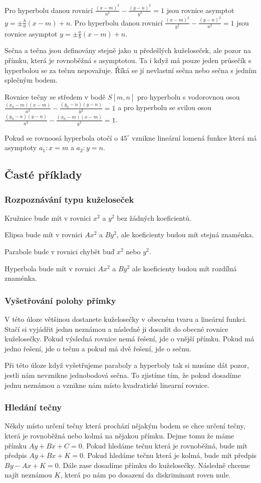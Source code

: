 \documentclass[12pt]{article}
\begin{document}
Pro hyperbolu danou rovnicí $\frac{(x-m)^2}{a^2} - \frac{(y-n)^2}{b^2} = 1$ jsou rovnice asymptot
$y = \pm \frac{b}{a}(x-m) + n$. Pro hyperbolu danou rovnicí $\frac{(x-m)^2}{b^2} - \frac{(y-n)^2}{a^2}
= 1$ jsou rovnice asymptot $y = \pm \frac{a}{b}(x-m)+n$.

Sečna a tečna jsou definovány stejně jako u předešlých kuželoseček, ale pozor na přímku, která je
rovnoběžná s asymptotou. Ta i když má pouze jeden průsečík s hyperbolou se za tečnu nepovažuje. Říká
se jí nevlastní sečna nebo sečna s jedním splečným bodem.

Rovnice tečny se středem v bodě $S[m,n]$ pro hyperbolu s vodorovnou osou $\frac{(x_0 - m)(x - m)}
{a^2} - \frac{(y_0 - n)(y-n)}{b^2} = 1$ a pro hyperbolu se svilou osou $\frac{(y_0 - n)(y-n)}{a^2} -
\frac{(x_0 - m)(x - m)}{b^2} = 1$.

Pokud se rovnoosá hyperbola otočí o $45^\circ$ vznikne lineární lomená funkce která má asymptoty
$a_1: x = m$ a $a_2: y = n$.
\subsection*{Časté příklady}
\subsubsection*{Rozpoznávání typu kuželoseček}
Kružnice bude mít v rovnici $x^2$ a $y^2$ bez žádných koeficientů.

Elipsa bude mít v rovnici $Ax^2$ a $By^2$, ale koeficienty budou mít stejná znaménka.

Parabole bude v rovnici chybět buď $x^2$ nebo $y^2$.

Hyperbola bude mít v rovnici $Ax^2$ a $By^2$ ale koeficienty budou mít rozdílná znaménka.
\subsubsection*{Vyšetřování polohy přímky}
V této úloze většinou dostanete kuželosečky v obecném tvaru a lineární funkci. Stačí si vyjádřit
jednu neznámou a následně ji dosadit do obecné rovnice kuželosečky. Pokud výsledná rovnice nemá
řešení, jde o vnější přímku. Pokud má jedno řešení, jde o tečnu a pokud má dvě řešení, jde o sečnu.

Při této úloze když vyšetřujeme paraboly a hyperboly tak si musíme dát pozor, jestli nám nevznikne
jednobodová sečna. To zjistíme tím, že pokud dosadíme jednu neznámou a vznikne nám místo kvadratické
linearní rovnice.
\subsubsection*{Hledání tečny}
Někdy místo určení tečny která prochází nějakým bodem se chce určení tečny, která je rovnoběžná nebo
kolmá na nějakou přímku. Dejme tomu že máme přímku $Ay + Bx + C = 0$. Pokud hledáme tečnu která je
rovnoběžná, bude mít předpis $Ay + Bx + K = 0$. Pokud hledáme tečnu která je kolmá, bude mít předpis
$By - Ax + K = 0$. Dále zase dosadíme přímku do kuželosečky. Následně chceme najít neznámou $K$,
která po nám po dosazení da diskriminant roven nule.
\end{document}
